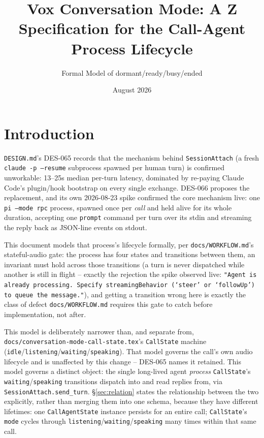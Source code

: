 \documentclass[a4paper,10pt,fleqn]{article}
\begin{document}
\title{Vox Conversation Mode: A Z Specification for the Call-Agent Process Lifecycle}
\author{Formal Model of dormant/ready/busy/ended}
\date{August 2026}
\maketitle

\tableofcontents
\newpage

\section{Introduction}

\texttt{DESIGN.md}'s DES-065 records that the mechanism behind
\texttt{SessionAttach} (a fresh \texttt{claude -p --resume} subprocess spawned
per human turn) is confirmed unworkable: 13--25s median per-turn latency,
dominated by re-paying Claude Code's plugin/hook bootstrap on every single
exchange. DES-066 proposes the replacement, and its own 2026-08-23 spike
confirmed the core mechanism live: one \texttt{pi --mode rpc} process, spawned
once per \emph{call} and held alive for its whole duration, accepting one
\texttt{prompt} command per turn over its stdin and streaming the reply back
as JSON-line events on stdout.

This document models that process's lifecycle formally, per
\texttt{docs/WORKFLOW.md}'s stateful-audio gate: the process has four states
and transitions between them, an invariant must hold across those transitions
(a turn is never dispatched while another is still in flight -- exactly the
rejection the spike observed live: \texttt{"Agent is already processing.
Specify streamingBehavior (\-`steer\-' or \-`followUp\-') to queue the
message."}), and getting a transition wrong here is exactly the class of
defect \texttt{docs/WORKFLOW.md} requires this gate to catch before
implementation, not after.

This model is deliberately narrower than, and separate from,
\texttt{docs/conversation-mode-call-state.tex}'s \texttt{CallState} machine
(\texttt{idle}/\texttt{listening}/\texttt{waiting}/\texttt{speaking}). That
model governs the call's own audio lifecycle and is unaffected by this
change -- DES-065 names it retained. This model governs a distinct object:
the single long-lived agent \emph{process} \texttt{CallState}'s
\texttt{waiting}/\texttt{speaking} transitions dispatch into and read replies
from, via \texttt{SessionAttach.send\_turn}. \S\ref{sec:relation} states the
relationship between the two explicitly, rather than merging them into one
schema, because they have different lifetimes: one \texttt{CallAgentState}
instance persists for an entire call; \texttt{CallState}'s \texttt{mode}
cycles through \texttt{listening}/\texttt{waiting}/\texttt{speaking} many
times within that same call.
\end{document}
